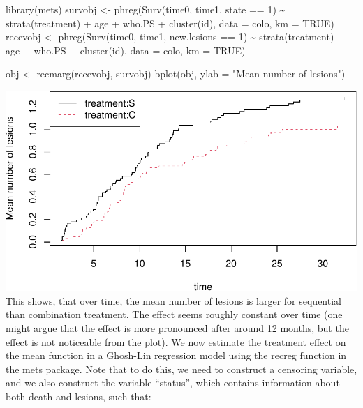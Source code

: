 \documentclass[
  11pt,
]{article}
\newenvironment{Shaded}{\begin{snugshade}}{\end{snugshade}}
\newcommand{\AttributeTok}[1]{\textcolor[rgb]{0.77,0.63,0.00}{#1}}
\newcommand{\ConstantTok}[1]{\textcolor[rgb]{0.00,0.00,0.00}{#1}}
\newcommand{\DecValTok}[1]{\textcolor[rgb]{0.00,0.00,0.81}{#1}}
\newcommand{\FunctionTok}[1]{\textcolor[rgb]{0.00,0.00,0.00}{#1}}
\newcommand{\NormalTok}[1]{#1}
\newcommand{\OtherTok}[1]{\textcolor[rgb]{0.56,0.35,0.01}{#1}}
\newcommand{\SpecialCharTok}[1]{\textcolor[rgb]{0.00,0.00,0.00}{#1}}
\newcommand{\StringTok}[1]{\textcolor[rgb]{0.31,0.60,0.02}{#1}}
\begin{document}
\begin{Shaded}
\begin{Highlighting}[]
\FunctionTok{library}\NormalTok{(mets)}
\NormalTok{survobj }\OtherTok{\textless{}{-}} \FunctionTok{phreg}\NormalTok{(}\FunctionTok{Surv}\NormalTok{(time0, time1, state }\SpecialCharTok{==} \DecValTok{1}\NormalTok{) }\SpecialCharTok{\textasciitilde{}} \FunctionTok{strata}\NormalTok{(treatment) }\SpecialCharTok{+}\NormalTok{ age }\SpecialCharTok{+} 
\NormalTok{                   who.PS }\SpecialCharTok{+} \FunctionTok{cluster}\NormalTok{(id), }\AttributeTok{data =}\NormalTok{ colo, }\AttributeTok{km =} \ConstantTok{TRUE}\NormalTok{)}
\NormalTok{recevobj }\OtherTok{\textless{}{-}} \FunctionTok{phreg}\NormalTok{(}\FunctionTok{Surv}\NormalTok{(time0, time1, new.lesions }\SpecialCharTok{==} \DecValTok{1}\NormalTok{) }\SpecialCharTok{\textasciitilde{}} \FunctionTok{strata}\NormalTok{(treatment) }\SpecialCharTok{+} 
\NormalTok{                  age }\SpecialCharTok{+}\NormalTok{ who.PS }\SpecialCharTok{+} \FunctionTok{cluster}\NormalTok{(id), }\AttributeTok{data =}\NormalTok{ colo, }\AttributeTok{km =} \ConstantTok{TRUE}\NormalTok{)}

\NormalTok{obj }\OtherTok{\textless{}{-}} \FunctionTok{recmarg}\NormalTok{(recevobj, survobj)}
\FunctionTok{bplot}\NormalTok{(obj, }\AttributeTok{ylab =} \StringTok{"Mean number of lesions"}\NormalTok{)}
\end{Highlighting}
\end{Shaded}

\includegraphics{Exam2021_files/figure-latex/unnamed-chunk-14-1.pdf}
This shows, that over time, the mean number of lesions is larger for
sequential than combination treatment. The effect seems roughly constant
over time (one might argue that the effect is more pronounced after
around 12 months, but the effect is not noticeable from the plot). We
now estimate the treatment effect on the mean function in a Ghosh-Lin
regression model using the recreg function in the mets package. Note
that to do this, we need to construct a censoring variable, and we also
construct the variable ``status'', which contains information about both
death and lesions, such that:
\end{document}
